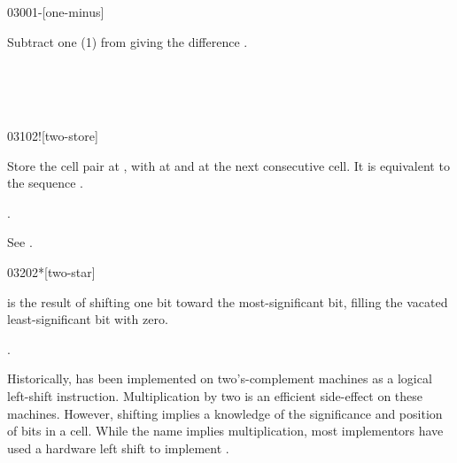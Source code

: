 \begin{worddef}{0300}{1-}[one-minus]
\item {}

	Subtract one (1) from  giving the difference
	.

	\begin{testing} %
		 \\
		 \\
		 \\
	\end{testing}
\end{worddef}


\begin{worddef}{0310}{2!}[two-store]
\item {}

	Store the cell pair  at , with
	 at  and  at the next
	consecutive cell. It is equivalent to the sequence
	  \word{!}  \word{!}.

\see {}.

	\begin{testing} %
		See .
	\end{testing}
\end{worddef}


\begin{worddef}{0320}{2*}[two-star]
\item {}

	 is the result of shifting  one bit toward
	the most-significant bit, filling the vacated least-significant
	bit with zero.

\see {}.

	\begin{rationale} %
		Historically,  has been implemented on
		two's-complement machines as a logical left-shift instruction.
		Multiplication by two is an efficient side-effect on these
		machines. However, shifting implies a knowledge of the
		significance and position of bits in a cell. While the name
		implies multiplication, most implementors have used a hardware
		left shift to implement .
	\end{rationale}

	\begin{testing} %
		 \\
		 \\
		 \\
		 \\
	\end{testing}
\end{worddef}



